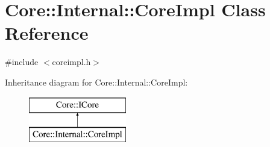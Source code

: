 \hypertarget{class_core_1_1_internal_1_1_core_impl}{\section{\-Core\-:\-:\-Internal\-:\-:\-Core\-Impl \-Class \-Reference}
\label{class_core_1_1_internal_1_1_core_impl}
}


{\ttfamily \#include $<$coreimpl.\-h$>$}

\-Inheritance diagram for \-Core\-:\-:\-Internal\-:\-:\-Core\-Impl\-:\begin{figure}[H]
\begin{center}
\leavevmode
\includegraphics[height=2.000000cm]{class_core_1_1_internal_1_1_core_impl}
\end{center}
\end{figure}
